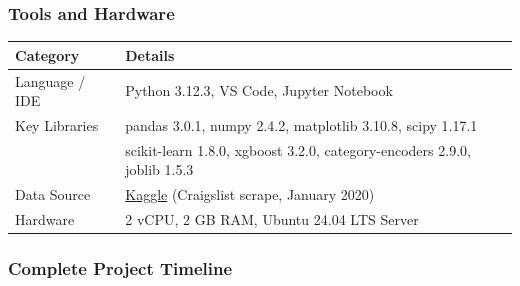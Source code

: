 
\subsubsection*{Tools and Hardware}

{\renewcommand{\arraystretch}{0.75}
\begin{center}
\begin{tabular}{ll}
\hline
\textbf{Category} & \textbf{Details} \\
\hline
Language / IDE & Python 3.12.3, VS Code, Jupyter Notebook \\
Key Libraries & pandas 3.0.1, numpy 2.4.2, matplotlib 3.10.8, scipy 1.17.1 \\
               & scikit-learn 1.8.0, xgboost 3.2.0, category-encoders 2.9.0, joblib 1.5.3 \\
Data Source    & \href{https://www.kaggle.com/datasets/austinreese/usa-housing-listings}{Kaggle} (Craigslist scrape, January 2020) \\
Hardware       & 2 vCPU, 2 GB RAM, Ubuntu 24.04 LTS Server \\
\hline
\end{tabular}
\end{center}}%

\subsubsection*{Complete Project Timeline}

